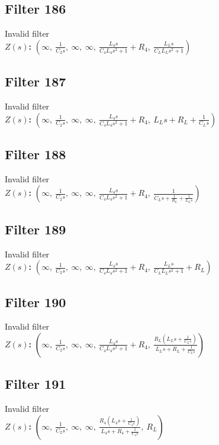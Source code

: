 \documentclass{article}
\begin{document}
\subsection*{Filter 186}
Invalid filter \\ 
\textbf{$Z(s)$:} $\left( \infty, \  \frac{1}{C_{2} s}, \  \infty, \  \infty, \  \frac{L_{4} s}{C_{4} L_{4} s^{2} + 1} + R_{4}, \  \frac{L_{L} s}{C_{L} L_{L} s^{2} + 1}\right)$ \\ 
\subsection*{Filter 187}
Invalid filter \\ 
\textbf{$Z(s)$:} $\left( \infty, \  \frac{1}{C_{2} s}, \  \infty, \  \infty, \  \frac{L_{4} s}{C_{4} L_{4} s^{2} + 1} + R_{4}, \  L_{L} s + R_{L} + \frac{1}{C_{L} s}\right)$ \\ 
\subsection*{Filter 188}
Invalid filter \\ 
\textbf{$Z(s)$:} $\left( \infty, \  \frac{1}{C_{2} s}, \  \infty, \  \infty, \  \frac{L_{4} s}{C_{4} L_{4} s^{2} + 1} + R_{4}, \  \frac{1}{C_{L} s + \frac{1}{R_{L}} + \frac{1}{L_{L} s}}\right)$ \\ 
\subsection*{Filter 189}
Invalid filter \\ 
\textbf{$Z(s)$:} $\left( \infty, \  \frac{1}{C_{2} s}, \  \infty, \  \infty, \  \frac{L_{4} s}{C_{4} L_{4} s^{2} + 1} + R_{4}, \  \frac{L_{L} s}{C_{L} L_{L} s^{2} + 1} + R_{L}\right)$ \\ 
\subsection*{Filter 190}
Invalid filter \\ 
\textbf{$Z(s)$:} $\left( \infty, \  \frac{1}{C_{2} s}, \  \infty, \  \infty, \  \frac{L_{4} s}{C_{4} L_{4} s^{2} + 1} + R_{4}, \  \frac{R_{L} \left(L_{L} s + \frac{1}{C_{L} s}\right)}{L_{L} s + R_{L} + \frac{1}{C_{L} s}}\right)$ \\ 
\subsection*{Filter 191}
Invalid filter \\ 
\textbf{$Z(s)$:} $\left( \infty, \  \frac{1}{C_{2} s}, \  \infty, \  \infty, \  \frac{R_{4} \left(L_{4} s + \frac{1}{C_{4} s}\right)}{L_{4} s + R_{4} + \frac{1}{C_{4} s}}, \  R_{L}\right)$ \\ 
\end{document}
